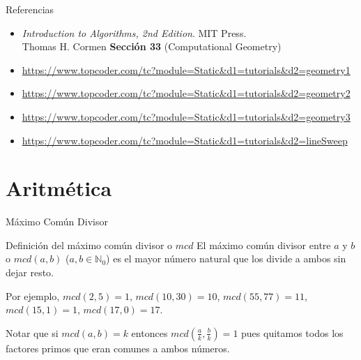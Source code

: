 \documentclass[compress]{beamer}
\begin{document}
\begin{frame}{Referencias}
   \begin{itemize}
   \item \textit{Introduction to Algorithms, 2nd Edition}. MIT Press. \\ Thomas H. Cormen
   \textbf{Sección 33} (Computational Geometry)
   \item \url{https://www.topcoder.com/tc?module=Static&d1=tutorials&d2=geometry1}
   \item \url{https://www.topcoder.com/tc?module=Static&d1=tutorials&d2=geometry2}
   \item \url{https://www.topcoder.com/tc?module=Static&d1=tutorials&d2=geometry3}
   \item \url{https://www.topcoder.com/tc?module=Static&d1=tutorials&d2=lineSweep}
  \end{itemize}
  
\end{frame}

\section{Aritmética}
\begin{frame}{M\'aximo Com\'un Divisor}
\begin{block}{Definici\'on del m\'aximo com\'un divisor o $mcd$}
El m\'aximo com\'un divisor entre $a$ y $b$ o $mcd(a,b)$ ($a, b \in \mathbb{N}_0$) es el mayor n\'umero natural que los divide a ambos sin dejar resto. 
\end{block}  

Por ejemplo, $mcd(2,5) = 1$, $mcd(10,30) = 10$, $mcd(55,77) = 11$, $mcd(15,1) = 1$, $mcd(17,0) = 17$. \\
\bigskip

Notar que si $mcd(a,b) = k$ entonces $mcd(\frac{a}{k}, \frac{b}{k}) = 1$ pues quitamos todos los factores primos que eran comunes a ambos n\'umeros.

\end{frame}
\end{document}

